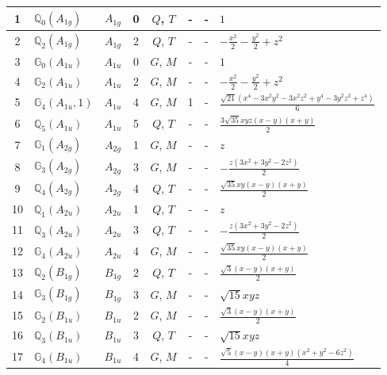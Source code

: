 \documentclass[fleqn,10pt,landscape]{jsarticle}
\begin{document}
\begin{longtable}[l]{clcccccl}
1 & $\mathbb{Q}_{0}(A_{1g})$ & $A_{1g}$ & 0 & $Q$, $T$ & - & - & $1$ \\ \hline
2 & $\mathbb{Q}_{2}(A_{1g})$ & $A_{1g}$ & 2 & $Q$, $T$ & - & - & $- \frac{x^{2}}{2} - \frac{y^{2}}{2} + z^{2}$ \\ \hline
3 & $\mathbb{G}_{0}(A_{1u})$ & $A_{1u}$ & 0 & $G$, $M$ & - & - & $1$ \\ \hline
4 & $\mathbb{G}_{2}(A_{1u})$ & $A_{1u}$ & 2 & $G$, $M$ & - & - & $- \frac{x^{2}}{2} - \frac{y^{2}}{2} + z^{2}$ \\ \hline
5 & $\mathbb{G}_{4}(A_{1u},1)$ & $A_{1u}$ & 4 & $G$, $M$ & 1 & - & $\frac{\sqrt{21} \left(x^{4} - 3 x^{2} y^{2} - 3 x^{2} z^{2} + y^{4} - 3 y^{2} z^{2} + z^{4}\right)}{6}$ \\ \hline
6 & $\mathbb{Q}_{5}(A_{1u})$ & $A_{1u}$ & 5 & $Q$, $T$ & - & - & $\frac{3 \sqrt{35} x y z \left(x - y\right) \left(x + y\right)}{2}$ \\ \hline
7 & $\mathbb{G}_{1}(A_{2g})$ & $A_{2g}$ & 1 & $G$, $M$ & - & - & $z$ \\ \hline
8 & $\mathbb{G}_{3}(A_{2g})$ & $A_{2g}$ & 3 & $G$, $M$ & - & - & $- \frac{z \left(3 x^{2} + 3 y^{2} - 2 z^{2}\right)}{2}$ \\ \hline
9 & $\mathbb{Q}_{4}(A_{2g})$ & $A_{2g}$ & 4 & $Q$, $T$ & - & - & $\frac{\sqrt{35} x y \left(x - y\right) \left(x + y\right)}{2}$ \\ \hline
10 & $\mathbb{Q}_{1}(A_{2u})$ & $A_{2u}$ & 1 & $Q$, $T$ & - & - & $z$ \\ \hline
11 & $\mathbb{Q}_{3}(A_{2u})$ & $A_{2u}$ & 3 & $Q$, $T$ & - & - & $- \frac{z \left(3 x^{2} + 3 y^{2} - 2 z^{2}\right)}{2}$ \\ \hline
12 & $\mathbb{G}_{4}(A_{2u})$ & $A_{2u}$ & 4 & $G$, $M$ & - & - & $\frac{\sqrt{35} x y \left(x - y\right) \left(x + y\right)}{2}$ \\ \hline
13 & $\mathbb{Q}_{2}(B_{1g})$ & $B_{1g}$ & 2 & $Q$, $T$ & - & - & $\frac{\sqrt{3} \left(x - y\right) \left(x + y\right)}{2}$ \\ \hline
14 & $\mathbb{G}_{3}(B_{1g})$ & $B_{1g}$ & 3 & $G$, $M$ & - & - & $\sqrt{15} x y z$ \\ \hline
15 & $\mathbb{G}_{2}(B_{1u})$ & $B_{1u}$ & 2 & $G$, $M$ & - & - & $\frac{\sqrt{3} \left(x - y\right) \left(x + y\right)}{2}$ \\ \hline
16 & $\mathbb{Q}_{3}(B_{1u})$ & $B_{1u}$ & 3 & $Q$, $T$ & - & - & $\sqrt{15} x y z$ \\ \hline
17 & $\mathbb{G}_{4}(B_{1u})$ & $B_{1u}$ & 4 & $G$, $M$ & - & - & $\frac{\sqrt{5} \left(x - y\right) \left(x + y\right) \left(x^{2} + y^{2} - 6 z^{2}\right)}{4}$ \\ \hline

\end{longtable}
\end{document}
